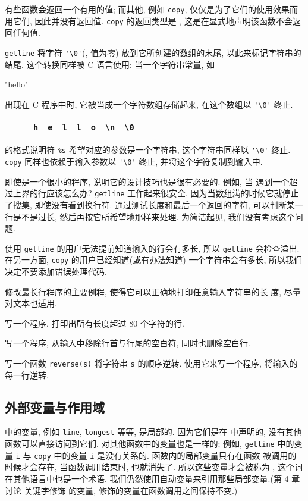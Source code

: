 有些函数会返回一个有用的值; 而其他, 例如 \texttt{copy},
仅仅是为了它们的使用效果而用它们, 因此并没有返回值. \texttt{copy}
的返回类型是 \cvoid, 这是在显式地声明该函数不会返回任何值.

\texttt{getline} 将字符 \verb"'\0'"(, 值为零)
放到它所创建的数组的末尾, 以此来标记字符串的结尾. 这个转换同样被 C
语言使用: 当一个字符串常量, 如
\begin{myverbatim} "hello\n" \end{myverbatim}
出现在 C 程序中时, 它被当成一个字符数组存储起来, 在这个数组以 \verb"'\0'"
终止.
\begin{figure}[th]
\begin{tabular}{|c|c|c|c|c|c|c|}
    \hline
    \texttt{h}  & \texttt{e} & \texttt{l} & \texttt{l} & \texttt{o} &
    \verb"\n" & \verb"\0"   \\
    \hline
\end{tabular}
\end{figure}
\printf 的格式说明符 \verb"%s" 希望对应的参数是一个字符串, 这个字符串同样以
\verb"'\0'" 终止. \texttt{copy} 同样也依赖于输入参数以 \verb"'\0'" 终止,
并将这个字符复制到输入中.

即使是一个很小的程序, 说明它的设计技巧也是很有必要的. 例如, 当 \cmain
遇到一个超过上界的行应该怎么办? \texttt{getline} 工作起来很安全,
因为当数组满的时候它就停止了搜集, 即使没有看到换行符.
通过测试长度和最后一个返回的字符, \cmain 可以判断某一行是不是过长,
然后再按它所希望地那样来处理. 为简洁起见, 我们没有考虑这个问题.

使用 \texttt{getline} 的用户无法提前知道输入的行会有多长, 所以
\texttt{getline} 会检查溢出. 在另一方面, \texttt{copy}
的用户已经知道(或有办法知道) 一个字符串会有多长,
所以我们决定不要添加错误处理代码. 

\exercise 修改最长行程序的主要例程, 使得它可以正确地打印任意输入字符串的长
度, 尽量对文本也适用.

\exercise 写一个程序, 打印出所有长度超过 80 个字符的行.

\exercise 写一个程序, 从输入中移除行首与行尾的空白符, 同时也删除空白行.

\exercise 写一个函数 \texttt{reverse(s)} 将字符串 \texttt{s} 的顺序逆转.
使用它来写一个程序, 将输入的每一行逆转.

\subsection{外部变量与作用域}
\cmain 中的变量, 例如 \texttt{line}, \texttt{longest} 等等, 是局部的.
因为它们是在 \cmain 中声明的, 没有其他函数可以直接访问到它们.
对其他函数中的变量也是一样的; 例如, \texttt{getline} 中的变量 \texttt{i} 与
\texttt{copy} 中的变量 \texttt{i} 是没有关系的. 函数内的局部变量只有在函数
被调用的时候才会存在, 当函数调用结束时, 也就消失了. 所以这些变量才会被称为%
, 这个词在其他语言中也是一个术语.
我们仍然使用自动变量来引用那些局部变量.(第 4 章讨论 \cstatic 关键字修饰
的变量, \cstatic 修饰的变量在函数调用之间保持不变.)

